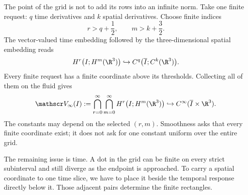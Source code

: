 The point of the grid is not to add its rows into an infinite norm.  Take one
finite request: \(q\) time derivatives and \(k\) spatial derivatives.  Choose
finite indices
\[
  r>q+\frac12,
  \qquad
  m>k+\frac32.
\]
The vector-valued time embedding followed by the three-dimensional spatial
embedding \parencite[Theorem~7.28]{Cerda2010} reads
\[
  H^r\bigl(I;H^m(\R^3)\bigr)
  \hookrightarrow
  C^q\bigl(\overline I;C^k(\R^3)\bigr).
\]
Every finite request has a finite coordinate above its thresholds.  Collecting
all of them on the fluid gives
\begin{equation}\label{eq:BodyFormalMixedIntersection}
  \mathscr V_\infty(I)
  :=\bigcap_{r=0}^{\infty}\bigcap_{m=0}^{\infty}
  H^r\bigl(I;H^m(\R^3)\bigr)
  \hookrightarrow C^\infty(\overline I\times\R^3).
\end{equation}
The constants may depend on the selected \((r,m)\).  Smoothness asks that
every finite coordinate exist; it does not ask for one constant uniform over
the entire grid.

The remaining issue is time.  A dot in the grid can be finite on every strict
subinterval and still diverge as the endpoint is approached.  To carry a
spatial coordinate to one time slice, we have to place it beside the temporal
response directly below it.  Those adjacent pairs determine the finite
rectangles.

